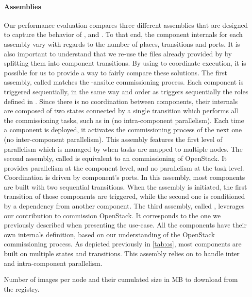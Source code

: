 \paragraph{Assemblies}
Our performance evaluation compares three different assemblies that are designed
to capture the behavior of \ansible, \aeolus and \mad. To that end, the
component internals for each assembly vary with regards to the number of
places, transitions and ports. It is also important to understand that we re-use
the \ansible files already provided by \kolla by splitting them into component
transitions. By using \mad to coordinate \ansible execution, it is possible for
us to provide a way to fairly compare these solutions.
The first assembly, called \ansass matches the \kolla-ansible
commissioning process. Each component is triggered sequentially, in the same way
and order as \ansible triggers sequentially the roles defined in \kolla. Since
there is no coordination between components, their internals are composed of two
states connected by a single transition which performs all the commissioning
tasks, such as in \kolla (\ie no intra-component parallelism). Each time a
component is deployed, it activates the commissioning process of the next one
(\ie no inter-component parallelism). This assembly features the first level of
parallelism which is managed by \ansible when tasks are mapped to multiple
nodes.
%
The second assembly, called \aeoass is equivalent to an \aeolus
commissioning of OpenStack. It provides parallelism at the component level, and
no parallelism at the task level. Coordination is driven by component's ports.
In this assembly, most components are built with two sequential transitions.
When the assembly is initiated, the first transition of those components are
triggered, while the second one is conditioned by a dependency from another
component.
%
The third assembly, called \madass, leverages our contribution to
commission OpenStack. It corresponds to the one we previously described when
presenting the use-case. All the components have their own internals definition,
based on our understanding of the OpenStack commissioning process. As depicted
previously in \cref{tab:os}, most components are built on multiple states and
transitions. This assembly relies on \mad to handle inter and intra-component
parallelism.

\begin{table}
  \begin{center}
    
    \caption{Number of \docker images per node and their cumulated size in MB to
      download from the registry.}
    \label{tab:images}
  \end{center}
\end{table}

